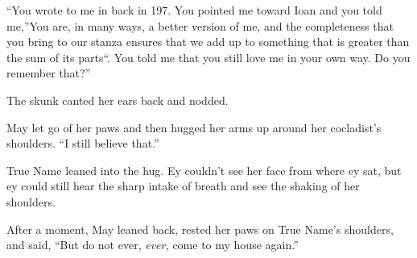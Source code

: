 ``You wrote to me in back in 197. You pointed me toward Ioan and you told me,''You are, in many ways, a better version of me, and the completeness that you bring to our stanza ensures that we add up to something that is greater than the sum of its parts``. You told me that you still love me in your own way. Do you remember that?''

The skunk canted her ears back and nodded.

May let go of her paws and then hugged her arms up around her cocladist's shoulders. ``I still believe that.''

True Name leaned into the hug. Ey couldn't see her face from where ey sat, but ey could still hear the sharp intake of breath and see the shaking of her shoulders.

After a moment, May leaned back, rested her paws on True Name's shoulders, and said, ``But do not ever, \emph{ever,} come to my house again.''
